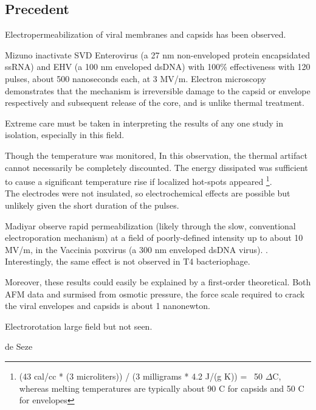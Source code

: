 \documentclass[paper.tex]{subfiles}
\begin{document}
\begin{multicols}{1}
\subsection{Precedent}

Electropermeabilization of viral membranes and capsids has been observed.

Mizuno \cite{Inactivation1990} inactivate SVD Enterovirus (a 27 nm non-enveloped protein encapsidated ssRNA) and EHV (a 100 nm enveloped dsDNA) with 100\% effectiveness with 120 pulses, about 500 nanoseconds each, at 3 MV/m. Electron microscopy demonstrates that the mechanism is irreversible damage to the capsid or envelope respectively and subsequent release of the core, and is unlike thermal treatment.

\begin{autem}
Extreme care must be taken in interpreting the results of any one study in isolation, especially in this field. 

Though the temperature was monitored, In this observation, the thermal artifact cannot necessarily be completely discounted. The energy dissipated was sufficient to cause a significant temperature rise if localized hot-spots appeared \footnote{(43 cal/cc * (3 microliters)) / (3 milligrams * 4.2 J/(g K)) = ~50 $\Delta$C, whereas melting temperatures are typically about 90 C for capsids \cite{Thermal1999} and 50 C for envelopes\cite{Stability1985}}. \\ The electrodes were not insulated, so electrochemical effects are possible but unlikely given the short duration of the pulses. 
\end{autem}

Madiyar \cite{Manipulation2013} observe rapid permeabilization (likely through the slow, conventional electroporation mechanism) at a field of poorly-defined intensity up to about 10 MV/m, in the Vaccinia poxvirus (a 300 nm enveloped dsDNA virus). \cite{AC2017}. Interestingly, the same effect is not observed in T4 bacteriophage. 

Moreover, these results could easily be explained by a first-order theoretical. Both AFM data and surmised from osmotic pressure, the force scale required to crack the viral envelopes and capsids is about 1 nanonewton. 


Electrorotation large field but not seen.

de Seze





\pagebreak


\end{multicols}
\end{document}
